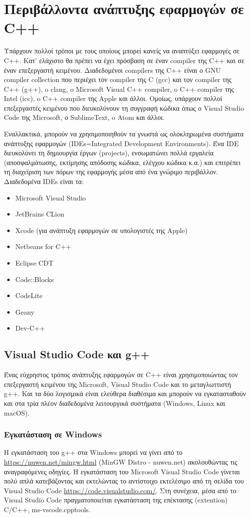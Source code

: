 \section*{Περιβάλλοντα ανάπτυξης εφαρμογών σε C++}
Υπάρχουν πολλοί τρόποι με τους οποίους μπορεί κανείς να αναπτύξει εφαρμογές σε C++. Κατ' ελάχιστο θα πρέπει να έχει πρόσβαση σε έναν compiler της C++ και σε έναν επεξεργαστή κειμένου. Διαδεδομένοι compilers της C++ είναι ο GNU compiler collection που περιέχει τον compiler της C (gcc) και τον compiler της C++ (g++), o clang, o Microsoft Visual C++ compiler, o C++ compiler της Intel (icc), o C++ compiler της Apple και άλλοι. Ομοίως, υπάρχουν πολλοί επεξεργαστές κειμένου που διευκολύνουν τη συγγραφή κώδικα όπως ο Visual Studio Code της Microsoft, ο SublimeText, o Atom και άλλοι.

Εναλλακτικά, μπορούν να χρησιμοποιηθούν τα γνωστά ως ολοκληρωμένα συστήματα ανάπτυξης εφαρμογών (IDEs=Integrated Development Environments). Ένα IDE διευκολύνει τη δημιουργία έργων (projects), ενσωματώνει πολλά εργαλεία (αποσφαλμάτωσης, εκτίμησης απόδοσης κώδικα, ελέγχου κώδικα κ.α.) και επιτρέπει τη διαχείριση των πόρων της εφαρμογής μέσα από ένα γνώριμο περιβάλλον. Διαδεδομένα IDEs είναι τα:
\begin{itemize}[nolistsep]
\item Microsoft Visual Studio
\item JetBrains CLion
\item Xcode (για ανάπτυξη εφαρμογών σε υπολογιστές της Apple)
\item Netbeans for C++
\item Eclipse CDT
\item Code::Blocks
\item CodeLite
\item Geany 
\item Dev-C++
\end{itemize}  

\subsection*{Visual Studio Code και g++}
Ένας εύχρηστος τρόπος ανάπτυξης εφαρμογών σε C++ είναι χρησιμοποιώντας τον επεξεργαστή κειμένου της Microsoft, Visual Studio Code και το μεταγλωττιστή g++. Και τα δύο λογισμικά είναι ελεύθερα διαθέσιμα και μπορούν να εγκατασταθούν και στα τρία πλέον διαδεδομένα λειτουργικά συστήματα (Windows, Linux και macOS).   

\subsubsection*{Εγκατάσταση σε Windows}
Η εγκατάσταση του g++ στα Windows μπορεί να γίνει από το \href{https://nuwen.net/mingw.html}{https://nuwen.net/mingw.html} (MinGW Distro - nuwen.net) ακολουθώντας τις αναγραφόμενες οδηγίες. Η εγκατάσταση του Microsoft Visual Studio Code γίνεται πολύ απλά κατεβάζοντας και εκτελώντας το αντίστοιχο εκτελέσιμο από τη σελίδα του Visual Studio Code \href{https://code.visualstudio.com/}{https://code.visualstudio.com/}. Στη συνέχεια, μέσα από το Visual Studio Code πραγματοποιείται εγκατάσταση της επέκτασης (extention) C/C++, ms-vscode.cpptools.

